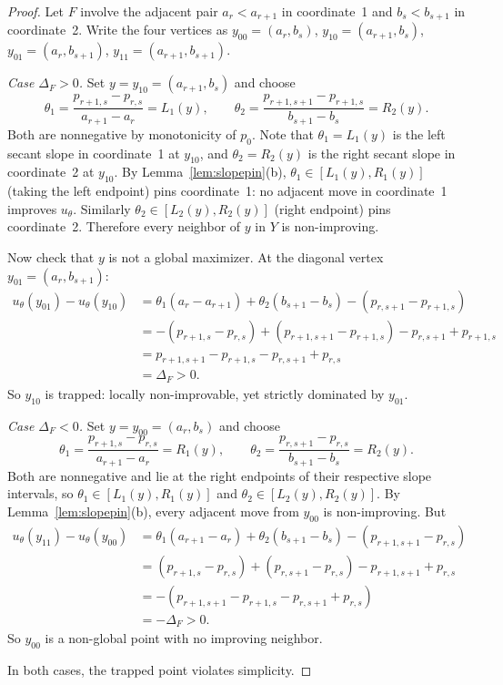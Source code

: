 \documentclass[11pt]{article}
\begin{document}
\begin{proof}
Let $F$ involve the adjacent pair $a_r < a_{r+1}$ in coordinate~1 and
$b_s < b_{s+1}$ in coordinate~2.  Write the four vertices as
$y_{00} = (a_r, b_s)$, $y_{10} = (a_{r+1}, b_s)$,
$y_{01} = (a_r, b_{s+1})$, $y_{11} = (a_{r+1}, b_{s+1})$.

\smallskip
\emph{Case $\Delta_F > 0$.}
Set $y = y_{10} = (a_{r+1}, b_s)$ and choose
\[
  \theta_1 = \frac{p_{r+1,s} - p_{r,s}}{a_{r+1} - a_r} = L_1(y),
  \qquad
  \theta_2 = \frac{p_{r+1,s+1} - p_{r+1,s}}{b_{s+1} - b_s} = R_2(y).
\]
Both are nonneg\-ative by mono\-tonicity of $p_0$.
Note that $\theta_1 = L_1(y)$ is the left secant slope
in coordinate~1 at $y_{10}$, and $\theta_2 = R_2(y)$ is the right secant slope
in coordinate~2 at $y_{10}$.
By Lemma~\ref{lem:slopepin}(b), $\theta_1 \in [L_1(y), R_1(y)]$ (taking
the left endpoint) pins coordinate~1: no adjacent move in coordinate~1
improves $u_\theta$.  Similarly $\theta_2 \in [L_2(y), R_2(y)]$ (right endpoint)
pins coordinate~2.  Therefore every neighbor of $y$ in $Y$ is non-improving.

Now check that $y$ is not a global maximizer.
At the diagonal vertex $y_{01} = (a_r, b_{s+1})$:
\begin{align*}
  u_\theta(y_{01}) - u_\theta(y_{10})
  &= \theta_1(a_r - a_{r+1}) + \theta_2(b_{s+1} - b_s) - (p_{r,s+1} - p_{r+1,s}) \\
  &= -(p_{r+1,s} - p_{r,s}) + (p_{r+1,s+1} - p_{r+1,s}) - p_{r,s+1} + p_{r+1,s} \\
  &= p_{r+1,s+1} - p_{r+1,s} - p_{r,s+1} + p_{r,s} \\
  &= \Delta_F > 0.
\end{align*}
So $y_{10}$ is trapped: locally non-improvable, yet strictly dominated by $y_{01}$.

\smallskip
\emph{Case $\Delta_F < 0$.}
Set $y = y_{00} = (a_r, b_s)$ and choose
\[
  \theta_1 = \frac{p_{r+1,s} - p_{r,s}}{a_{r+1} - a_r} = R_1(y),
  \qquad
  \theta_2 = \frac{p_{r,s+1} - p_{r,s}}{b_{s+1} - b_s} = R_2(y).
\]
Both are nonneg\-ative and lie at the right endpoints of their respective
slope intervals, so $\theta_1 \in [L_1(y), R_1(y)]$ and
$\theta_2 \in [L_2(y), R_2(y)]$.
By Lemma~\ref{lem:slopepin}(b), every adjacent move from $y_{00}$ is
non-improving.  But
\begin{align*}
  u_\theta(y_{11}) - u_\theta(y_{00})
  &= \theta_1(a_{r+1} - a_r) + \theta_2(b_{s+1} - b_s) - (p_{r+1,s+1} - p_{r,s}) \\
  &= (p_{r+1,s} - p_{r,s}) + (p_{r,s+1} - p_{r,s}) - p_{r+1,s+1} + p_{r,s} \\
  &= -(p_{r+1,s+1} - p_{r+1,s} - p_{r,s+1} + p_{r,s}) \\
  &= -\Delta_F > 0.
\end{align*}
So $y_{00}$ is a non-global point with no improving neighbor.

\smallskip
In both cases, the trapped point violates simplicity.
\end{proof}
\end{document}
